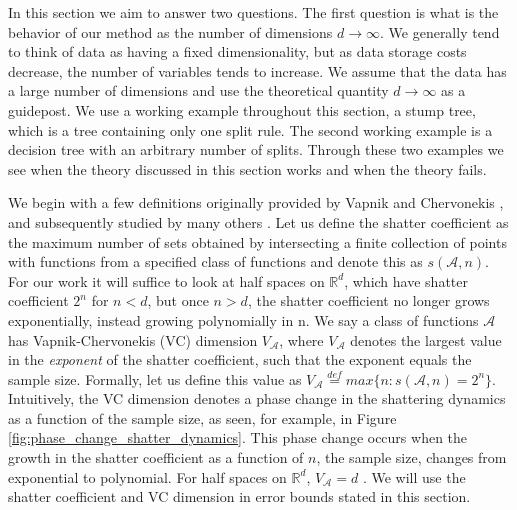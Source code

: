 In this section we aim to answer two questions. The first question is what is the behavior of our method as the number of dimensions $d \to \infty$. We generally tend to think of data as having a fixed dimensionality, but as data storage costs decrease, the number of variables tends to increase. We assume that the data has a large number of dimensions and use the theoretical quantity $d \to \infty$ as a guidepost. We use a working example throughout this section, a stump tree, which is a tree containing only one split rule. The second working example is a decision tree with an arbitrary number of splits. Through these two examples we see when the theory discussed in this section works and when the theory fails.  

We begin with a few definitions originally provided by Vapnik and Chervonekis \cite{vapnik1971uniform}, and subsequently studied by many others \cite{steele1978empirical} \cite{devroye1996probabilistic}. Let us define the shatter coefficient as the maximum number of sets obtained by intersecting a finite collection of points with functions from a specified class of functions and denote this as $s(\mathcal{A},n)$. For our work it will suffice to look at half spaces on $\mathbb{R}^d$, which have shatter coefficient $2^n$ for $n<d$, but once $n>d$, the shatter coefficient no longer grows exponentially, instead growing polynomially in n. We say a class of functions $\mathcal{A}$ has Vapnik-Chervonekis (VC) dimension $V_\mathcal{A}$, where $V_\mathcal{A}$ denotes the largest value in the \emph{exponent} of the shatter coefficient, such that the exponent equals the sample size. Formally, let us define this value as $V_\mathcal{A}\overset{def}{=}max\{n:s(\mathcal{A},n)=2^n\}$. Intuitively, the VC dimension denotes a phase change in the shattering dynamics as a function of the sample size, as seen, for example, in Figure \ref{fig:phase_change_shatter_dynamics}. This phase change occurs when the growth in the shatter coefficient as a function of $n$, the sample size, changes from exponential to polynomial. For half spaces on $\mathbb{R}^d$, $V_\mathcal{A}=d$ \cite{devroye1996probabilistic}. We will use the shatter coefficient and VC dimension in error bounds stated in this section.  


